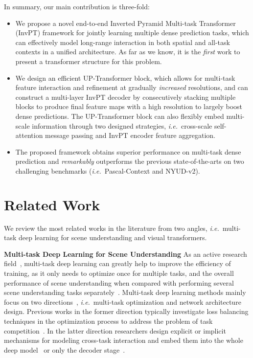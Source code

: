 \documentclass[runningheads]{llncs}
\newcommand*{\ie}{\emph{i.e.}}
\begin{document}
\par In summary, our main contribution is three-fold:
\begin{itemize}
\vspace{-5pt}
\setlength{\parskip}{-1pt}
  \item We propose a novel end-to-end Inverted Pyramid Multi-task Transformer (InvPT) framework for jointly learning multiple dense prediction tasks, which can effectively model long-range interaction in both spatial and all-task contexts in a unified architecture. As far as we know, it is the \emph{first} work to present a transformer structure for this problem.
  \item We design an efficient UP-Transformer block, which allows for multi-task feature interaction and refinement at gradually \emph{increased} resolutions, and can construct a multi-layer InvPT decoder by consecutively stacking multiple blocks to produce final feature maps with a high resolution to largely boost dense predictions. The UP-Transformer block can also flexibly embed multi-scale information through two designed strategies, \ie~cross-scale self-attention message passing and InvPT encoder feature aggregation.
    \item The proposed framework obtains superior performance on multi-task dense prediction and \emph{remarkably} outperforms the previous state-of-the-arts on two challenging benchmarks (\ie~Pascal-Context and NYUD-v2).
\end{itemize}

\vspace{-8pt}
\section{Related Work}
\label{sec:relatedwork}
We review the most related works in the literature from two angles, \ie~multi-task deep learning for scene understanding and visual transformers.

\par\noindent\textbf{Multi-task Deep Learning for Scene Understanding} As an active research field~\cite{liang2019multi,astmt,padnet},
multi-task deep learning can greatly help to improve the efficiency of training, as it only needs to optimize once for multiple tasks, and the overall performance of scene understanding when compared with performing several scene understanding tasks separately~\cite{mti}.
Multi-task deep learning methods mainly focus on two directions~\cite{mtlsurvey}, \ie~multi-task optimization and network architecture design.
Previous works in the former direction typically investigate loss balancing techniques in the optimization process to address the problem of task competition~\cite{gradnorm,gradientsign,kendall2018multi}.
In the latter direction researchers design explicit or implicit mechanisms for modeling cross-task interaction and embed them into the whole deep model~\cite{crossstitch,sluice,nddr} or only the decoder stage~\cite{papnet,psd,zhang2021transfer}.
\end{document}
